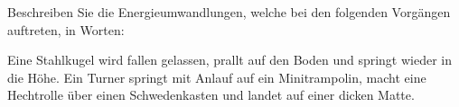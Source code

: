 Beschreiben Sie die Energieumwandlungen, welche bei den folgenden Vorgängen auftreten, in Worten:

\begin{abcliste}
\abc Eine Stahlkugel wird fallen gelassen, prallt auf den Boden und springt wieder in die Höhe.
\abc Ein Turner springt mit Anlauf auf ein Minitrampolin, macht eine Hechtrolle über einen Schwedenkasten und landet auf einer dicken Matte.
\end{abcliste}
